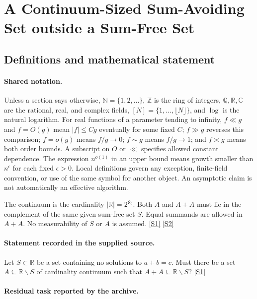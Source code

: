\documentclass[11pt,a4paper]{article}
\newcommand{\N}{\mathbb{N}}
\newcommand{\Z}{\mathbb{Z}}
\newcommand{\Q}{\mathbb{Q}}
\newcommand{\R}{\mathbb{R}}
\newcommand{\C}{\mathbb{C}}
\newcommand{\sref}[2]{\hyperlink{source:#1:#2}{[S#2]}}
\begin{document}
\section{A Continuum-Sized Sum-Avoiding Set outside a Sum-Free Set}\label{statement}


\subsection{Definitions and mathematical statement}

\paragraph{Shared notation.}Unless a section says otherwise, $\N=\{1,2,\ldots\}$,
$\Z$ is the ring of integers, $\Q,\R,\C$ are the rational, real, and complex
fields, $[N]=\{1,\ldots,\lfloor N\rfloor\}$, and $\log$ is the natural
logarithm. For real functions of a parameter tending to infinity,
$f\ll g$ and $f=O(g)$ mean $|f|\leq Cg$ eventually for some fixed $C$;
$f\gg g$ reverses this comparison; $f=o(g)$ means $f/g\to0$;
$f\sim g$ means $f/g\to1$; and $f\asymp g$ means both order bounds.
A subscript on $O$ or $\ll$ specifies allowed constant dependence.
The expression $n^{o(1)}$ in an upper bound means growth smaller than
$n^\epsilon$ for each fixed $\epsilon>0$. Local definitions govern any
exception, finite-field convention, or use of the same symbol for another
object. An asymptotic claim is not automatically an effective algorithm.



The continuum is the cardinality $|\R|=2^{\aleph_0}$. Both $A$ and $A+A$ must lie in the complement of the same given sum-free set $S$. Equal summands are allowed in $A+A$. No measurability of $S$ or $A$ is assumed. \sref{statement}{1} \sref{statement}{2}

\paragraph{Statement recorded in the supplied source.}
Let $S\subset \mathbb{R}$ be a set containing no solutions to $a+b=c$. Must there be a set $A\subseteq \mathbb{R}\backslash S$ of cardinality continuum such that $A+A\subseteq \mathbb{R}\backslash S$? \sref{statement}{1}

\paragraph{Residual task reported by the archive.}
\end{document}
